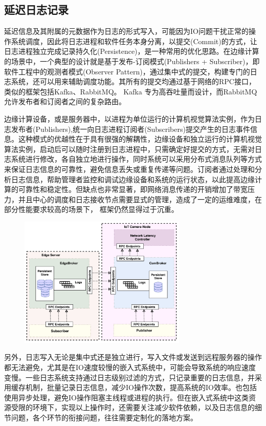 \documentclass[master]{shtthesis}
\begin{document}
\subsection{延迟日志记录}\label{延迟日志记录}
延迟信息及其附属的元数据作为日志的形式写入，可能因为IO问题干扰正常的操作系统调度，因此将日志进程和软件任务本身分离，以提交(Commit)的方式，让日志进程独立完成记录持久化(Persistence)，是一种常用的优化思路。在边缘计算的场景中，一个典型的设计就是基于发布-订阅模式(Publishers + Subscriber)，即软件工程中的观测者模式(Observer Pattern)，通过集中式的提交，构建专门的日志系统，还可以用来辅助调度功能。其所有的提交均通过基于网络的RPC接口，类似的框架包括Kafka\cite{kreps2011kafka}、RabbitMQ。 Kafka 专为高吞吐量而设计，而RabbitMQ允许发布者和订阅者之间的复杂路由\cite{dobbelaere2017kafka}。


边缘计算设备，或是服务器中，以进程为单位运行的计算机视觉算法实例，作为日志发布者(Publishers),统一向日志进程订阅者(Subscribers)提交产生的日志事件信息。这种模式的优越性在于具有很强的解耦性，边缘设备和独立运行的计算机视觉算法实例，启动后可以随时注册到日志进程中，只需确定好提交的方式，无需对日志系统进行修改，各自独立地进行操作，同时系统可以采用分布式消息队列等方式来保证日志信息的可靠性，避免信息丢失或重复传递等问题。订阅者通过处理和分析日志信息，帮助管理者监控和调试边缘设备和系统的运行状态，以此提高边缘计算的可靠性和稳定性。但缺点也非常显著，即网络消息传递的开销增加了带宽压力，并且中心的调度和日志接收节点需要显式的管理，造成了一定的运维难度，在部分性能要求较高的场景下，
框架仍然显得过于沉重。

\begin{figure}[htbp]
	\centering
	\includegraphics[width=8cm]{img/rpc_log.png}
	\label{基于发布订阅的边缘计算日志系统}
\end{figure}

另外，日志写入无论是集中式还是独立进行，写入文件或发送到远程服务器的操作都无法避免，尤其是在IO速度较慢的嵌入式系统中，可能会导致系统的响应速度变慢。一些日志系统支持通过日志级别过滤的方式，只记录重要的日志信息，并采用缓存机制，批量记录日志信息，减少IO操作次数，提高系统的IO效率。也包括使用异步处理，避免IO操作阻塞主线程或进程的执行。但在嵌入式系统中这类资源受限的环境下，实现以上操作时，还需要关注减少软件依赖，以及日志信息的细节问题，各个环节的衔接问题，往往需要定制化的落地方案。
\end{document}
